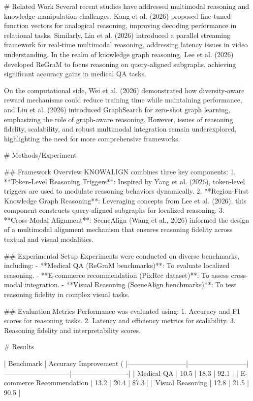 # Related Work
Several recent studies have addressed multimodal reasoning and knowledge manipulation challenges. Kang et al. (2026) proposed fine-tuned function vectors for analogical reasoning, improving decoding performance in relational tasks. Similarly, Lin et al. (2026) introduced a parallel streaming framework for real-time multimodal reasoning, addressing latency issues in video understanding. In the realm of knowledge graph reasoning, Lee et al. (2026) developed ReGraM to focus reasoning on query-aligned subgraphs, achieving significant accuracy gains in medical QA tasks. 

On the computational side, Wei et al. (2026) demonstrated how diversity-aware reward mechanisms could reduce training time while maintaining performance, and Liu et al. (2026) introduced GraphSearch for zero-shot graph learning, emphasizing the role of graph-aware reasoning. However, issues of reasoning fidelity, scalability, and robust multimodal integration remain underexplored, highlighting the need for more comprehensive frameworks.

# Methods/Experiment

## Framework Overview
KNOWALIGN combines three key components:
1. **Token-Level Reasoning Triggers**: Inspired by Yang et al. (2026), token-level triggers are used to modulate reasoning behaviors dynamically.
2. **Region-First Knowledge Graph Reasoning**: Leveraging concepts from Lee et al. (2026), this component constructs query-aligned subgraphs for localized reasoning.
3. **Cross-Modal Alignment**: SceneAlign (Wang et al., 2026) informed the design of a multimodal alignment mechanism that ensures reasoning fidelity across textual and visual modalities.

## Experimental Setup
Experiments were conducted on diverse benchmarks, including:
- **Medical QA (ReGraM benchmarks)**: To evaluate localized reasoning.
- **E-commerce recommendation (PixRec dataset)**: To assess cross-modal integration.
- **Visual Reasoning (SceneAlign benchmarks)**: To test reasoning fidelity in complex visual tasks.

## Evaluation Metrics
Performance was evaluated using:
1. Accuracy and F1 scores for reasoning tasks.
2. Latency and efficiency metrics for scalability.
3. Reasoning fidelity and interpretability scores.

# Results

| Benchmark               | Accuracy Improvement (%
|--------------------------|--------------------------|-----------------------------|-------------------------|
| Medical QA              | 10.5                    | 18.3                        | 92.1                   |
| E-commerce Recommendation | 13.2                    | 20.4                        | 87.3                   |
| Visual Reasoning         | 12.8                    | 21.5                        | 90.5                   |

